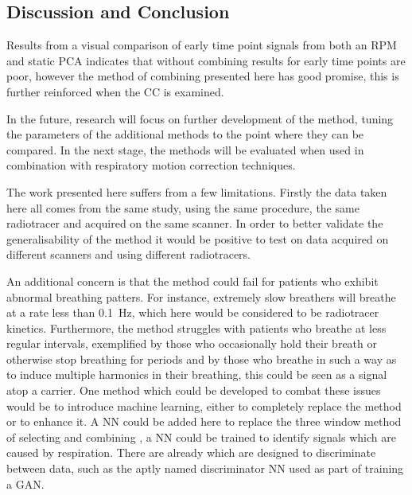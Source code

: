         \subsection{Discussion and Conclusion} \label{sec:pca_data_driven_surrogate_signal_extraction_methods_for_dynamic_pet_discussion_and_conclusion}
            Results from a visual comparison of early time point signals from both an \gls{RPM} and static \gls{PCA} indicates that without combining  results for early time points are poor, however the method of combining  presented here has good promise, this is further reinforced when the \gls{CC} is examined.
            
            In the future, research will focus on further development of the method, tuning the parameters of the additional methods to the point where they can be compared. In the next stage, the methods will be evaluated when used in combination with respiratory motion correction techniques.
            
            The work presented here suffers from a few limitations. Firstly the data taken here all comes from the same study, using the same procedure, the same radiotracer and acquired on the same scanner. In order to better validate the generalisability of the method it would be positive to test on data acquired on different scanners and using different radiotracers.
            
            An additional concern is that the method could fail for patients who exhibit abnormal breathing patters. For instance, extremely slow breathers will breathe at a rate less than \SI{0.1}{\hertz}, which here would be considered to be radiotracer kinetics. Furthermore, the method struggles with patients who breathe at less regular intervals, exemplified by those who occasionally hold their breath or otherwise stop breathing for periods and by those who breathe in such a way as to induce multiple harmonics in their breathing, this could be seen as a signal atop a carrier. One method which could be developed to combat these issues would be to introduce machine learning, either to completely replace the method or to enhance it. A \gls{NN} could be added here to replace the three window method of selecting and combining , a \gls{NN} could be trained to identify signals which are caused by respiration. There are already  which are designed to discriminate between data, such as the aptly named discriminator \gls{NN} used as part of training a \gls{GAN}.
    
